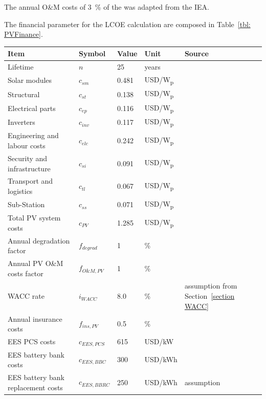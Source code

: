The annual O\&M costs of \SI{3}{\percent} of the was adapted from the IEA. \cite{IEA2014c}

The financial parameter for the LCOE calculation are composed in Table~\ref{tbl: PVFinance}.
\pagebreak
\begin{table}[!h]  
  \centering
	\begin{tabular}{  p{5.4cm} C{1.5cm} C{1.5cm}  C{1.7cm}  C{4.0cm} } 
	\hline	
\textbf{Item} & \textbf{Symbol}& \textbf{Value} & \textbf{Unit} & \textbf{Source}\\ \hline \hline
Lifetime &$n$ & 25 & years & \cite{FraunhoferISE2013} \\ \hline
Solar modules & $c_{sm}$&0.481 & USD/W\textsubscript{p} & \cite{Terblanche2015}\\ 
Structural &$c_{st}$ &0.138 & USD/W\textsubscript{p} & \cite{Terblanche2015} \\ 
Electrical parts &$c_{ep}$ &0.116 & USD/W\textsubscript{p} & \cite{Terblanche2015} \\ 
Inverters&$c_{inv}$ &0.117 & USD/W\textsubscript{p} & \cite{Terblanche2015} \\ 
Engineering and labour costs & $c_{elc}$ & 0.242 & USD/W\textsubscript{p} & \cite{Terblanche2015} \\ 
Security and infrastructure & $c_{si}$& 0.091 & USD/W\textsubscript{p} & \cite{Terblanche2015} \\ 
Transport and logistics & $c_{tl}$& 0.067 & USD/W\textsubscript{p} & \cite{Terblanche2015}\\ 
Sub-Station & $c_{ss}$ & 0.071 & USD/W\textsubscript{p} &\cite{Terblanche2015} \\ \hline
Total PV system costs & $c_{PV}$ & 1.285 &  USD/W\textsubscript{p} &\cite{Terblanche2015} \\ 
Annual degradation factor &$f_{degrad}$ & 1 & \% & \cite{Tidball2010}\\ 
Annual PV O\&M costs factor &$f_{O\&M,PV}$ & 1 & \% & \cite{IEA2014a}\\
WACC rate & $i_{WACC}$ & 8.0 & \si{\percent} & assumption from Section~\ref{section WACC} \\ 
Annual insurance costs & $f_{ins,PV}$ & 0.5 & \% & \cite{InternationalFinanceCorporation2015}\\ \hline
EES PCS costs & $c_{EES,PCS}$ & 615 & USD/kW & \cite{Zakeri2015} \\ 
EES battery bank costs & $c_{EES,BBC}$ &300 & USD/kWh & \cite{Nykvist2015} \\ 
EES battery bank replacement costs & $c_{EES,BBRC}$ & 250 & USD/kWh & assumption \\ 

\end{tabular}
\end{table}
